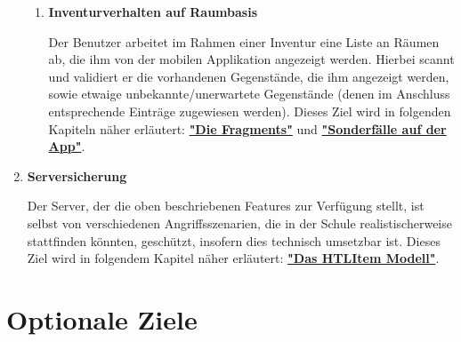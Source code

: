 \documentclass[
    headings=optiontotocandhead,%
    twoside,
    numbers=noenddot,%
    toc=flat, %
    12pt, %
    titlepage, %
    parskip=full, %
    listof=totoc, %
    listof=flat, %
    numbers=noenddot, %
    bibliography=totoc, %
    a4paper,DIV=14,
    BCOR=15mm,
]{scrbook}
\begin{document}
\begin{enumerate}
\begin{enumerate}
        \item	\textbf{Inventurverhalten auf Raumbasis}

        Der Benutzer arbeitet im Rahmen einer Inventur eine Liste an Räumen ab, die ihm von der mobilen Applikation angezeigt werden. Hierbei scannt und validiert er die vorhandenen Gegenstände, die ihm angezeigt werden, sowie etwaige unbekannte/unerwartete Gegenstände (denen im Anschluss entsprechende Einträge zugewiesen werden).
        Dieses Ziel wird in folgenden Kapiteln näher erläutert:  \textbf{\href{die-fragments}{"Die Fragments"}} und \textbf{\href{sonderfuxe4lle-auf-der-app}{"Sonderfälle auf der App"}}.
      \end{enumerate}

        \item \textbf{Serversicherung}

        Der Server, der die oben beschriebenen Features zur Verfügung stellt, ist selbst von verschiedenen Angriffsszenarien, die in der Schule realistischerweise stattfinden könnten, geschützt, insofern dies technisch umsetzbar ist. 
        Dieses Ziel wird in folgendem Kapitel näher erläutert: \textbf{\href{das-htlitem-modell}{"Das HTLItem Modell"}}.
    
\end{enumerate}



\section{Optionale Ziele}
\end{document}
